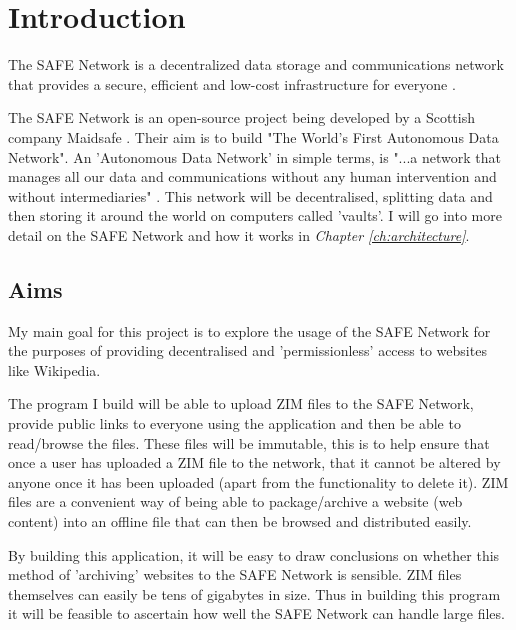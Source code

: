 \chapter{Introduction}

\begin{displayquote}
The SAFE Network is a decentralized data storage and communications network that provides a secure, efficient
and low-cost infrastructure for everyone \cite{safenetwork}.
\end{displayquote}

The SAFE Network \cite{safenetwork} is an open-source project being developed by a Scottish company Maidsafe \cite{maidsafe}. Their aim is to build "The World's First Autonomous Data Network". An 'Autonomous Data Network' in simple terms, is "...a network that manages all our data and communications without any human intervention and without intermediaries" \cite{autonomous-data-networks}. This network will be decentralised, splitting data and then storing it around the world on computers called 'vaults'. I will go into more detail on the SAFE Network and how it works in \textit{Chapter \ref{ch:architecture}}.

\section{Aims}

My main goal for this project is to explore the usage of the SAFE Network for the purposes of providing decentralised and 'permissionless' access to websites like Wikipedia.

The program I build will be able to upload ZIM\cite{zim} files to the SAFE Network, provide public links to everyone using the application and then be able to read/browse the files. These files will be immutable, this is to help ensure that once a user has uploaded a ZIM file to the network, that it cannot be altered by anyone once it has been uploaded (apart from the functionality to delete it). ZIM files are a convenient way of being able to package/archive a website (web content) into an offline file that can then be browsed and distributed easily.

By building this application, it will be easy to draw conclusions on whether this method of 'archiving' websites to the SAFE Network is sensible. ZIM files themselves can easily be tens of gigabytes in size. Thus in building this program it will be feasible to ascertain how well the SAFE Network can handle large files.

